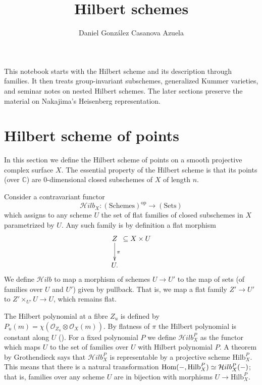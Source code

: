 
\usepackage{graphicx}
\usepackage{url}



\title{Hilbert schemes}
\author{Daniel González Casanova Azuela}
\maketitle
{}
\label{section-phantom}

\noindent
This notebook starts with the Hilbert
scheme and its description through families.
It then treats group-invariant subschemes,
generalized Kummer varieties, and seminar
notes on nested Hilbert schemes.
The later sections preserve the material
on Nakajima's Heisenberg representation.

\tableofcontents

\section{Hilbert scheme of points}
\label{section-hilbert-scheme}

\noindent
In this section we define
the Hilbert scheme of points
on a smooth projective complex surface $X$.
The essential property of the Hilbert scheme
is that its points (over $\mathbb{C}$)
are 0-dimensional closed subschemes of $X$
of length $n$.

\medskip\noindent
Consider a contravariant functor
$$
\mathcal{H}ilb_X:(\text{Schemes})^{\text{op}}\to (\text{Sets})
$$
which assigns to any scheme $U$ the set of
flat families
of closed subschemes in $X$ parametrized by
$U$.
Any such family is by definition a flat
morphism
$$
\xymatrix@C=.1em{
Z \ar[d]^\pi&\subseteq X \times U\\
U.
}
$$
We define $\mathcal{H}ilb$ to map a morphism
of schemes
$U \to U'$ to the map of sets (of families
over $U$ and $U'$) given
by pullback. That is, we map a flat family
$Z'\to U'$
to $Z'\times_{U'}U \to U$, which remains
flat.

The Hilbert polynomial at a fibre $Z_u$ is
defined by
$P_u(m)=\chi(\mathcal{O}_{Z_u}\otimes
\mathcal{O}_X(m))$.
By flatness of $\pi$ the Hilbert polynomial
is constant along $U$
(\cite[Part III, Theorem 9.9]{Hartshorne}).
For a fixed polynomial $P$
we define $\mathcal{H}ilb^P_X$ as the
functor which maps $U$
to the set of families over $U$ with Hilbert
polynomial $P$.
A theorem by Grothendieck says that
$\mathcal{H}ilb^P_X$ is representable
by a projective scheme $\text{Hilb}^P_X$.
This means that there is a natural
transformation
$\mathop{\mathrm{Hom}}\nolimits(-,\text{Hilb}^P_X) \simeq
\mathcal{H}ilb^P_X(-)$;
that is, families over any scheme $U$ are in
bijection with
morphisms $U \to \text{Hilb}^P_X$.

